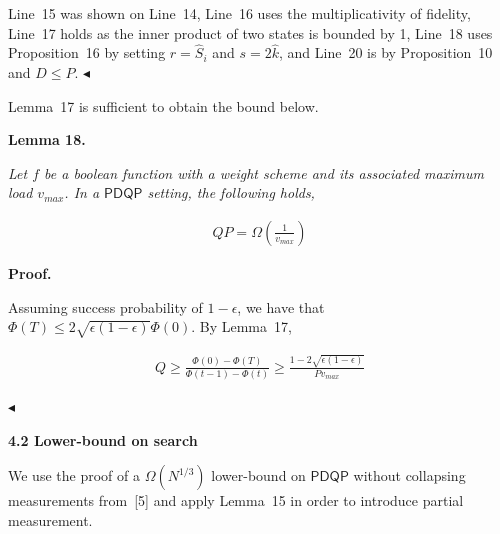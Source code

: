 \documentclass[10pt,a4paper]{article}
\begin{document}
Line 15 was shown on Line 14, Line 16 uses the multiplicativity of fidelity, Line 17 holds as the inner product of two states is bounded by 1, Line 18 uses Proposition 16 by setting $r=\hat{S}_{i}$ and $s=2\hat{k}$, and Line 20 is by Proposition 10 and $D\leq P$.
$\blacktriangleleft$\par




Lemma 17 is sufficient to obtain the bound below.\par





\par\medskip\noindent\textbf{
\textbf{Lemma 18}\textbf{.}
}\par



\emph{Let $f$ be a boolean function with a weight scheme and its associated maximum load $v_{max}$. In a $\mathsf{PDQP}$ setting, the following holds,}\par


\[\begin{gathered}
\displaystyle QP=\Omega\left(\frac{1}{v_{max}}\right)
\end{gathered}\]







\par\medskip\noindent\textbf{Proof.}\par




Assuming success probability of $1-\epsilon$, we have that $\Phi(T)\leq 2\sqrt{\epsilon(1-\epsilon)}\Phi(0)$. By Lemma 17,\par


\[\begin{gathered}
\displaystyle Q\geq\frac{\Phi(0)-\Phi(T)}{\Phi(t-1)-\Phi(t)}\geq\frac{1-2\sqrt{\epsilon(1-\epsilon)}}{Pv_{max}}
\end{gathered}\]


$\blacktriangleleft$\par






\par\medskip\noindent\textbf{
4.2 Lower-bound on search}\par




We use the proof of a $\Omega(N^{1/3})$ lower-bound on $\mathsf{PDQP}$ without collapsing measurements from [5] and apply Lemma 15 in order to introduce partial measurement.\par
\end{document}
